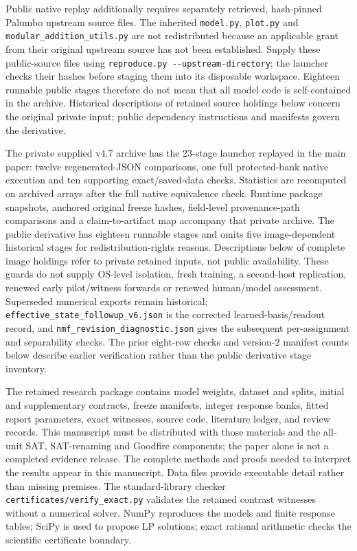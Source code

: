 \documentclass[
  british,
  11pt,
  a4paper,
]{article}
\begin{document}
Public native replay additionally requires separately retrieved,
hash-pinned Palumbo upstream source files. The inherited
\texttt{model.py}, \texttt{plot.py} and
\texttt{modular\_addition\_utils.py} are not redistributed because an
applicable grant from their original upstream source has not been
established. Supply these public-source files using
\texttt{reproduce.py\ -\/-upstream-directory}; the launcher checks their
hashes before staging them into its disposable workspace. Eighteen
runnable public stages therefore do not mean that all model code is
self-contained in the archive. Historical descriptions of retained
source holdings below concern the original private input; public
dependency instructions and manifests govern the derivative.

The private supplied v4.7 archive has the 23-stage launcher replayed in
the main paper: twelve regenerated-JSON comparisons, one full
protected-bank native execution and ten supporting exact/saved-data
checks. Statistics are recomputed on archived arrays after the full
native equivalence check. Runtime package snapshots, anchored original
freeze hashes, field-level provenance-path comparisons and a
claim-to-artifact map accompany that private archive. The public
derivative has eighteen runnable stages and omits five image-dependent
historical stages for redistribution-rights reasons. Descriptions below
of complete image holdings refer to private retained inputs, not public
availability. These guards do not supply OS-level isolation, fresh
training, a second-host replication, renewed early pilot/witness
forwards or renewed human/model assessment. Superseded numerical exports
remain historical; \texttt{effective\_state\_followup\_v6.json} is the
corrected learned-basis/readout record, and
\texttt{nmf\_revision\_diagnostic.json} gives the subsequent
per-assignment and separability checks. The prior eight-row checks and
version-2 manifest counts below describe earlier verification rather
than the public derivative stage inventory.

The retained research package contains model weights, dataset and
splits, initial and supplementary contracts, freeze manifests, integer
response banks, fitted report parameters, exact witnesses, source code,
literature ledger, and review records. This manuscript must be
distributed with those materials and the all-unit SAT, SAT-renaming and
Goodfire components; the paper alone is not a completed evidence
release. The complete methods and proofs needed to interpret the results
appear in this manuscript. Data files provide executable detail rather
than missing premises. The standard-library checker
\texttt{certificates/verify\_exact.py} validates the retained contrast
witnesses without a numerical solver. NumPy reproduces the models and
finite response tables; SciPy is used to propose LP solutions; exact
rational arithmetic checks the scientific certificate boundary.
\end{document}
